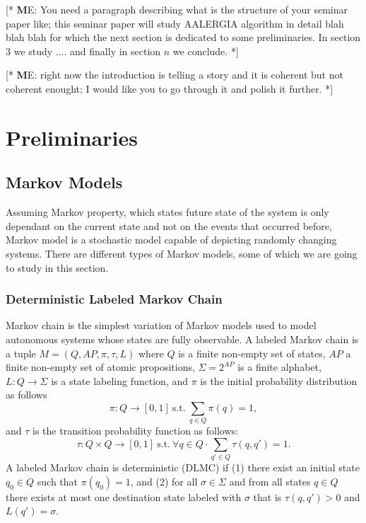 \documentclass[
a4paper,
12pt
]{scrartcl}
\newcommand\me[1]{ [* {\textbf ME:} #1 *]}
\begin{document}
\me{You need a paragraph describing what is the structure of your seminar paper like; this seminar paper will study AALERGIA algorithm in detail blah blah blah for which the next section is dedicated to some preliminaries. In section 3 we study .... and finally in section $n$ we conclude.}

\me{right now the introduction is telling a story and it is coherent but not coherent enought; I would like you to go through it and polish it further.}
\newpage
\section{Preliminaries}
\subsection{Markov Models}
Assuming Markov property, which states future state of the system is only dependant on the current state and not on the events that occurred before, Markov model is a stochastic model capable of depicting randomly changing systems. There are different types of Markov models, some of which we are going to study in this section.
\subsubsection{Deterministic Labeled Markov Chain}
Markov chain is the simplest variation of Markov models used to model autonomous systems whose states are fully observable. A labeled Markov chain is a tuple $M=(Q,AP,\pi,\tau,L)$ where $Q$ is a finite non-empty set of states, $AP$ a finite non-empty set of atomic propositions, $\Sigma=2^{AP}$ is a finite alphabet, $L:Q\to \Sigma$ is a state labeling function, and $\pi$ is the initial probability distribution as follows
\begin{equation*}
  \pi:Q\to [0,1]~\text{s.t.}~\sum_{q\in Q} \pi(q)=1,
\end{equation*}
and $\tau$ is the transition probability function as follows:
\begin{equation*}
  \tau: Q\times Q \to [0,1]~\text{s.t.}~\forall q \in Q \cdot \sum_{q'\in Q}\tau(q,q')=1.
\end{equation*}
A labeled Markov chain is deterministic (DLMC) if (1) there exist an initial state $q_0\in Q$ such that $\pi(q_0)=1$, and (2) for all $\sigma \in \Sigma$ and from all states $q \in Q$ there exists at most one destination state labeled with $\sigma$ that is $\tau(q,q')>0$ and $L(q')=\sigma$.
\end{document}

